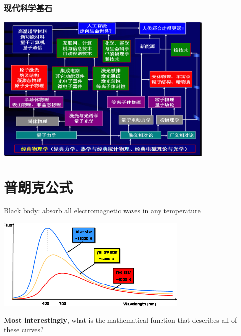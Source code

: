 \begin{frame}
    \frametitle{现代科学基石}
    \begin{center}
        \includegraphics[width=0.8\textwidth]{figs/stone.png}
    \end{center}   
\end{frame}

\section{普朗克公式}

\begin{frame}
    \begin{definition}
        Black body: absorb all electromagnetic waves in any temperature
    \end{definition}
    \begin{center}
        \includegraphics[width=0.7\textwidth]{figs/blackbody_radn_curves.png}
    \end{center}
    \textbf{\color{deepred} Most interestingly}, what is the mathematical function that describes all of these curves?
\end{frame}

